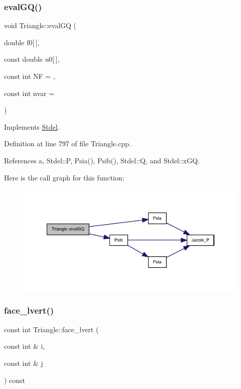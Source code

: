 \subsubsection{\texorpdfstring{eval\+G\+Q()}{evalGQ()}\hspace{0.1cm}{\footnotesize\ttfamily [2/2]}}
{\footnotesize\ttfamily void Triangle\+::eval\+GQ (\begin{DoxyParamCaption}\item[{double}]{f0\mbox{[}$\,$\mbox{]},  }\item[{const double}]{u0\mbox{[}$\,$\mbox{]},  }\item[{const int}]{NF = {},  }\item[{const int}]{nvar = {} }\end{DoxyParamCaption})\hspace{0.3cm}{\ttfamily [virtual]}}



Implements \hyperlink{classStdel_ae144597c3199b1757a5fbbc255e17baa}{Stdel}.



Definition at line 797 of file Triangle.\+cpp.



References a, Stdel\+::P, Psia(), Psib(), Stdel\+::Q, and Stdel\+::x\+GQ.

Here is the call graph for this function\+:
\nopagebreak
\begin{figure}[H]
\begin{center}
\leavevmode
\includegraphics[width=350pt]{classTriangle_aac6e3645b886cfd2f4f406157b696d5a_cgraph}
\end{center}
\end{figure}
\mbox{\label{classTriangle_a54ef3345b002746852e4f2eb2f698ae2}} 
\subsubsection{\texorpdfstring{face\+\_\+lvert()}{face\_lvert()}}
{\footnotesize\ttfamily const int Triangle\+::face\+\_\+lvert (\begin{DoxyParamCaption}\item[{const int \&}]{i,  }\item[{const int \&}]{j }\end{DoxyParamCaption}) const\hspace{0.3cm}{\ttfamily [virtual]}}



